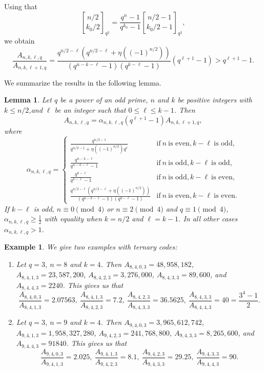 \documentclass[a4paper,11pt]{article}
\newtheorem{lemma}[theorem]{Lemma}
\newtheorem{example}{Example}
\begin{document}
\begin{itemize}
Using that $${n/2\brack k_0/2 }_{q^2}=\frac{q^n-1}{q^{k_0}-1}{n/2-1\brack k_0/2-1 }_{q^2},$$
we obtain
$$\frac{A_{n,k,\ell,q}}{A_{n,k,\ell+1,q}}=\frac{q^{n/2-\ell}(q^{n/2-\ell}+\eta((-1)^{n/2}))}{(q^{n-k-\ell}-1)(q^{k-\ell}-1)}(q^{\ell+1}-1)>q^{\ell+1}-1.$$
\end{itemize}

We summarize the results in the following lemma.

\begin{lemma}\label{lem-oddq} Let $q$ be a power of an odd prime, $n$ and $k$ be positive integers with $k\le n/2$,and $\ell$ be an integer such that $0\le\ell\le k-1$. Then
$$A_{n,k,\ell,q}=\alpha_{n,k,\ell,q}(q^{\ell+1}-1)A_{n,k,\ell+1,q},$$
where
\[
\alpha_{n,k,\ell,q}=\left\{\begin{array}{ll}
\frac{q^{n/2-1}}{q^{n/2-1}+\eta((-1)^{n/2})q^\ell}&\mbox{if} \ n \ \mbox{is even}, k-\ell \ \mbox{is odd},\\
\frac{q^{n-k-\ell}}{q^{n-k-\ell}-1}&\mbox{if} \ n \ \mbox{is odd}, k-\ell \ \mbox{is odd},\\
\frac{q^{k-\ell}}{q^{k-\ell}-1}&\mbox{if} \ n \ \mbox{is odd}, k-\ell \ \mbox{is even},\\
\frac{q^{n/2-\ell}(q^{n/2-\ell}+\eta((-1)^{n/2}))}{(q^{n-k-\ell}-1)(q^{k-\ell}-1)}&\mbox{if} \ n \ \mbox{is even}, k-\ell \ \mbox{is even}.
\end{array}\right.
\]
If $k-\ell$ is odd, $n\equiv 0\pmod 4$ or $n\equiv 2\pmod 4$ and $q\equiv 1\pmod 4$, $\alpha_{n,k,\ell,q}\ge\frac{1}{2}$ with equality when $k=n/2$ and $\ell=k-1$. In all other cases $\alpha_{n,k,\ell,q}>1$.
\end{lemma}

\begin{example} We give two examples with ternary codes:
\begin{enumerate}
\item Let $q=3$, $n=8$ and $k=4$. Then $A_{8,4,0,3}=48,958,182$,
$A_{8,4,1,3}=23,587,200$, $A_{8,4,2,3}= 3,276,000$, $A_{8,4,3,3}=89,600$, and $A_{8,4,4,3}=2240$. This gives us that
$$\frac{A_{8,4,0,3}}{A_{8,4,1,3}}=2.07563, \ \frac{A_{8,4,1,3}}{A_{8,4,2,3}}=7.2, \  \frac{A_{8,4,2,3}}{A_{8,4,3,3}}=36.5625, \ \frac{A_{8,4,3,3}}{A_{8,4,4,3}}=40=\frac{3^4-1}{2}.$$

\item Let $q=3$, $n=9$ and $k=4$. Then $A_{9,4,0,3}=3,965,612,742$,
$A_{9,4,1,3}=1,958,327,280$, $A_{9,4,2,3}=241,768,800$, $A_{9,4,3,3}=8,265,600$, and $A_{9,4,4,3}=91840$. This gives us that
$$\frac{A_{9,4,0,3}}{A_{9,4,1,3}}=2.025, \ \frac{A_{9,4,1,3}}{A_{9,4,2,3}}=8.1, \  \frac{A_{9,4,2,3}}{A_{9,4,3,3}}=29.25, \ \frac{A_{9,4,3,3}}{A_{9,4,4,3}}=90.$$
\end{enumerate}
\end{example}
\end{document}

